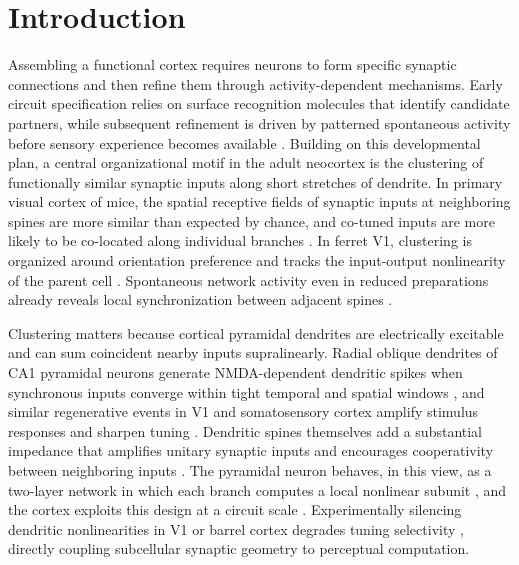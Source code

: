 \section{Introduction}

Assembling a functional cortex requires neurons to form specific synaptic connections and then refine them through activity-dependent mechanisms. Early circuit specification relies on surface recognition molecules that identify candidate partners, while subsequent refinement is driven by patterned spontaneous activity before sensory experience becomes available \citep{sanes2020synaptic}. Building on this developmental plan, a central organizational motif in the adult neocortex is the clustering of functionally similar synaptic inputs along short stretches of dendrite. In primary visual cortex of mice, the spatial receptive fields of synaptic inputs at neighboring spines are more similar than expected by chance, and co-tuned inputs are more likely to be co-located along individual branches \citep{iacaruso2017synaptic}. In ferret V1, clustering is organized around orientation preference and tracks the input-output nonlinearity of the parent cell \citep{wilson2016orientation}. Spontaneous network activity even in reduced preparations already reveals local synchronization between adjacent spines \citep{takahashi2012locally}.

Clustering matters because cortical pyramidal dendrites are electrically excitable and can sum coincident nearby inputs supralinearly. Radial oblique dendrites of CA1 pyramidal neurons generate NMDA-dependent dendritic spikes when synchronous inputs converge within tight temporal and spatial windows \citep{losonczy2006integrative}, and similar regenerative events in V1 and somatosensory cortex amplify stimulus responses and sharpen tuning \citep{smith2013dendritic,lavzin2012nonlinear}. Dendritic spines themselves add a substantial impedance that amplifies unitary synaptic inputs and encourages cooperativity between neighboring inputs \citep{harnett2012synaptic}. The pyramidal neuron behaves, in this view, as a two-layer network in which each branch computes a local nonlinear subunit \citep{poirazi2003pyramidal}, and the cortex exploits this design at a circuit scale \citep{larkum2013cellular}. Experimentally silencing dendritic nonlinearities in V1 or barrel cortex degrades tuning selectivity \citep{smith2013dendritic,lavzin2012nonlinear,wilson2018differential}, directly coupling subcellular synaptic geometry to perceptual computation.


